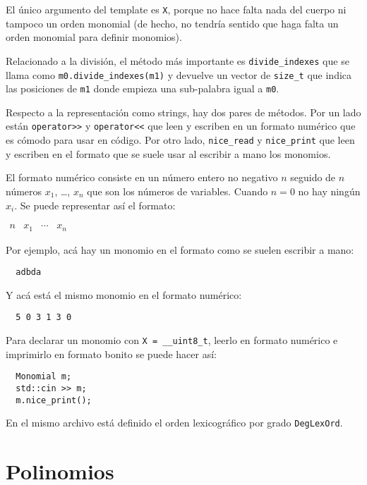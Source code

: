 \documentclass[12pt]{report}
\theoremstyle{customstyle}
\theoremstyle{factstyle}
\begin{document}
El único argumento del template es \texttt{X}, porque no hace falta nada del cuerpo ni tampoco un orden monomial (de hecho, no tendría sentido que haga falta un orden monomial para definir monomios).

Relacionado a la división, el método más importante es \texttt{divide\_indexes} que se llama como \texttt{m0.divide\_indexes(m1)} y devuelve un vector de \texttt{size\_t} que indica las posiciones de \texttt{m1} donde empieza una sub-palabra igual a \texttt{m0}.

Respecto a la representación como strings, hay dos pares de métodos. Por un lado están \texttt{operator>>} y \texttt{operator<<} que leen y escriben en un formato numérico que es cómodo para usar en código. Por otro lado, \texttt{nice\_read} y \texttt{nice\_print} que leen y escriben en el formato que se suele usar al escribir a mano los monomios.

El formato numérico consiste en un número entero no negativo $n$ seguido de $n$ números $x_1$, …, $x_n$ que son los números de variables. Cuando $n = 0$ no hay ningún $x_i$. Se puede representar así el formato:

$\begin{array}{llll} n & x_1 & ⋯ & x_n \end{array}$

Por ejemplo, acá hay un monomio en el formato como se suelen escribir a mano:

\begin{lstlisting}
  adbda
\end{lstlisting}

\noindent Y acá está el mismo monomio en el formato numérico:

\begin{lstlisting}
  5 0 3 1 3 0
\end{lstlisting}

Para declarar un monomio con \texttt{X = \_\_uint8\_t}, leerlo en formato numérico e imprimirlo en formato bonito se puede hacer así:

\begin{verbatim}
  Monomial m;
  std::cin >> m;
  m.nice_print();
\end{verbatim}

En el mismo archivo  está definido el orden lexicográfico por grado \texttt{DegLexOrd}.

\section{Polinomios}
\end{document}
